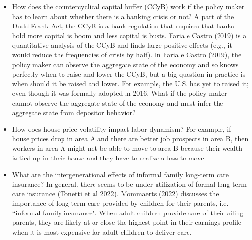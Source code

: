 \documentclass{article}
\begin{document}
\begin{itemize}

\item How does the countercyclical capital buffer (CCyB) work if the policy maker has to learn about whether there is a banking crisis or not? A part of the Dodd-Frank Act, the CCyB is a bank regulation that requires that banks hold more capital is boom and less capital is busts.  Faria e Castro (2019) is a quantitative analysis of the CCyB and finds large positive effects (e.g., it would reduce the frequencies of crisis by half). In Faria e Castro (2019), the policy maker can observe the aggregate state of the economy and so knows perfectly when to raise and lower the CCyB, but a big question in practice is when should it be raised and lower. For example, the U.S. has yet to raised it; even though it was formally adopted in 2016. What if the policy maker cannot observe the aggregate state of the economy and must infer the aggregate state from depositor behavior? 

\item How does house price volatility impact labor dynamism? For example, if house prices drop in area A and there are better job prospects in area B, then workers in area A might not be able to move to area B because their wealth is tied up in their house and they have to realize a loss to move.

\item What are the intergenerational effects of informal family long-term care insurance? In general, there seems to be under-utilization of formal long-term care insurance (Tonetti et al 2022). Mommaerts (2022) discusses the importance of long-term care provided by children for their parents, i.e. ``informal family insurance". When adult children provide care of their ailing parents, they are likely at or close the highest point in their earnings profile when it is most expensive for adult children to deliver care.

\end{itemize}
\end{document}
